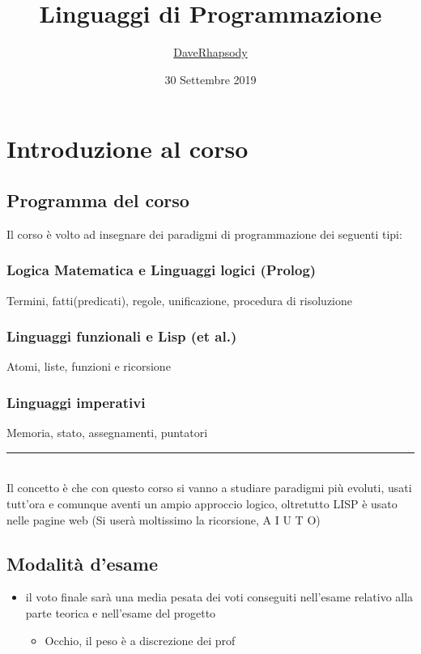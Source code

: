 \documentclass[12pt, a4paper, openany, oneside]{book}
\begin{document}
\selectfont
\author{\href{https://github.com/daverhapsody}{DaveRhapsody}}
\title{Linguaggi di Programmazione}
\color{blue}
\date{30 Settembre 2019}
\color{black}
\maketitle
\tableofcontents
\chapter{Introduzione al corso}
\section{Programma del corso}
Il corso è volto ad insegnare dei paradigmi di programmazione dei seguenti tipi:
\subsection{Logica Matematica e Linguaggi logici (Prolog)}
Termini, fatti(predicati), regole, unificazione, procedura di risoluzione
\subsection{Linguaggi funzionali e Lisp (et al.)}
Atomi, liste, funzioni e ricorsione
\subsection{Linguaggi imperativi}
\label{sub:linguaggi_imperativi}
Memoria, stato, assegnamenti, puntatori
\\ 
{\color{black} \rule{\linewidth}{0.3mm} }
\\
Il concetto è che con questo corso si vanno a studiare paradigmi più evoluti,
usati tutt'ora e comunque aventi un ampio approccio logico, oltretutto LISP è 
usato nelle pagine web (Si userà moltissimo la ricorsione, A I U T O)
\section{Modalità d'esame}
\label{sec:modalità_d_esame}
\begin{itemize}
	\item il voto finale sarà una media pesata dei voti conseguiti nell'esame 
	relativo alla parte teorica e nell'esame del progetto 
	\begin{itemize}
		\item Occhio, il peso è a discrezione dei prof
	\end{itemize}
\end{itemize}
\end{document}
